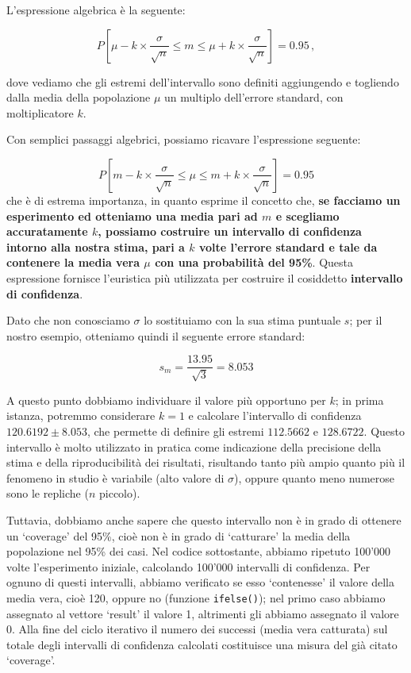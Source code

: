 \documentclass[a4paper,12pt,oneside]{book}
\begin{document}
L'espressione algebrica è la seguente:

\[P \left[ \mu - k \times \frac{\sigma}{\sqrt{n} } \leq m \leq \mu + k \times \frac{\sigma}{\sqrt{n} } \right] = 0.95 \, ,\]

dove vediamo che gli estremi dell'intervallo sono definiti aggiungendo e togliendo dalla media della popolazione \(\mu\) un multiplo dell'errore standard, con moltiplicatore \(k\).

Con semplici passaggi algebrici, possiamo ricavare l'espressione seguente:

\[P \left[ m - k \times \frac{\sigma}{\sqrt{n} } \leq \mu \leq m + k \times \frac{\sigma}{\sqrt{n} } \right] = 0.95\]
che è di estrema importanza, in quanto esprime il concetto che, \textbf{se facciamo un esperimento ed otteniamo una media pari ad \(m\) e scegliamo accuratamente \(k\), possiamo costruire un intervallo di confidenza intorno alla nostra stima, pari a \(k\) volte l'errore standard e tale da contenere la media vera \(\mu\) con una probabilità del 95\%}. Questa espressione fornisce l'euristica più utilizzata per costruire il cosiddetto \textbf{intervallo di confidenza}.

Dato che non conosciamo \(\sigma\) lo sostituiamo con la sua stima puntuale \(s\); per il nostro esempio, otteniamo quindi il seguente errore standard:

\[s_m = \frac{13.95}{\sqrt{3}} = 8.053\]

A questo punto dobbiamo individuare il valore più opportuno per \(k\); in prima istanza, potremmo considerare \(k = 1\) e calcolare l'intervallo di confidenza \(120.6192 \pm 8.053\), che permette di definire gli estremi \(112.5662\) e \(128.6722\). Questo intervallo è molto utilizzato in pratica come indicazione della precisione della stima e della riproducibilità dei risultati, risultando tanto più ampio quanto più il fenomeno in studio è variabile (alto valore di \(\sigma\)), oppure quanto meno numerose sono le repliche (\(n\) piccolo).

Tuttavia, dobbiamo anche sapere che questo intervallo non è in grado di ottenere un `coverage' del 95\%, cioè non è in grado di `catturare' la media della popolazione nel 95\% dei casi. Nel codice sottostante, abbiamo ripetuto 100'000 volte l'esperimento iniziale, calcolando 100'000 intervalli di confidenza. Per ognuno di questi intervalli, abbiamo verificato se esso `contenesse' il valore della media vera, cioè 120, oppure no (funzione \texttt{ifelse()}); nel primo caso abbiamo assegnato al vettore `result' il valore 1, altrimenti gli abbiamo assegnato il valore 0. Alla fine del ciclo iterativo il numero dei successi (media vera catturata) sul totale degli intervalli di confidenza calcolati costituisce una misura del già citato `coverage'.
\end{document}
